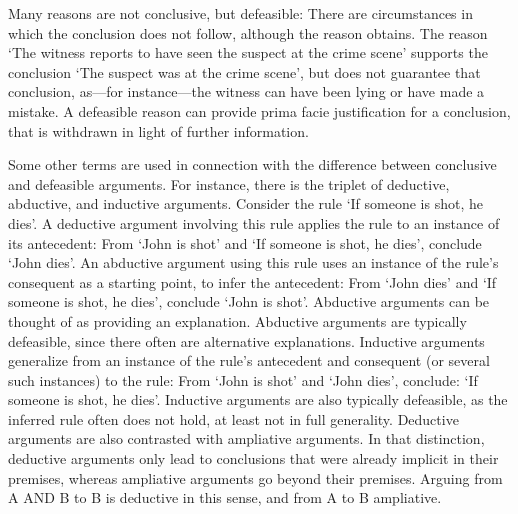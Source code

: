 \documentclass[10pt]{article}
\begin{document}

Many reasons are not conclusive, but defeasible: There are circumstances in which the conclusion does not follow, although the reason obtains. The reason `The witness reports to have seen the suspect at the crime scene' supports the conclusion `The suspect was at the crime scene', but does not guarantee that conclusion, as---for instance---the witness can have been lying or have made a mistake. A defeasible reason can provide prima facie justification for a conclusion, that is withdrawn in light of further information.


Some other terms are used in connection with the difference between conclusive and defeasible arguments. For instance, there is the triplet of deductive, abductive, and inductive arguments. Consider the rule `If someone is shot, he dies'. A deductive argument involving this rule applies the rule to an instance of its antecedent: From `John is shot' and `If someone is shot, he dies', conclude `John dies'. An abductive argument using this rule uses an instance of the rule's consequent as a starting point, to infer the antecedent: From `John dies' and  `If someone is shot, he dies', conclude `John is shot'. Abductive arguments can be thought of as providing an explanation. Abductive arguments are typically defeasible, since there often are alternative explanations. Inductive arguments generalize from an instance of the rule's antecedent and consequent (or several such instances) to the rule: From `John is shot' and `John dies', conclude: `If someone is shot, he dies'. Inductive arguments are also typically defeasible, as the inferred rule often does not hold, at least not in full generality. Deductive arguments are also contrasted with ampliative arguments. In that distinction, deductive arguments only lead to conclusions that were already implicit in their premises, whereas ampliative arguments go beyond their premises. Arguing from A AND B to B is deductive in this sense, and from A to B ampliative.
\end{document}
